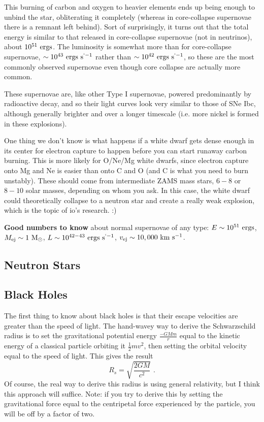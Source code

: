 This burning of carbon and oxygen to heavier elements ends up being enough to unbind the star, obliterating it completely (whereas in core-collapse supernovae there is a remnant left behind). Sort of surprisingly, it turns out that the total energy is similar to that released in core-collapse supernovae (not in neutrinos), about $10^{51}~{\rm ergs}$. The luminosity is somewhat more than for core-collapse supernovae, $\sim10^{43}~{\rm ergs}~{\rm s}^{`-1}$ rather than $\sim10^{42}~{\rm ergs}~{\rm s}^{`-1}$, so these are the most commonly observed supernovae even though core collapse are actually more common.

These supernovae are, like other Type I supernovae, powered predominantly by radioactive decay, and so their light curves look very similar to those of SNe Ibc, although generally brighter and over a longer timescale (i.e. more nickel is formed in these explosions).

One thing we don't know is what happens if a white dwarf gets dense enough in its center for electron capture to happen before you can start runaway carbon burning. This is more likely for O/Ne/Mg white dwarfs, since electron capture onto Mg and Ne is easier than onto C and O (and C is what you need to burn unstably). These should come from intermediate ZAMS mass stars, $6-8$ or $8-10$ solar masses, depending on whom you ask. In this case, the white dwarf could theoretically collapse to a neutron star and create a really weak explosion, which is the topic of io's research. :)

\textbf{Good numbers to know} about normal supernovae of any type: $E \sim 10^{51}~{\rm ergs}$, $M_{\rm ej} \sim 1~{\rm M}_\odot$, $L \sim 10^{42-43}~{\rm ergs}~{\rm s}^{`-1}$, $v_{\rm ej} \sim 10,000~{\rm km}~{\rm s}^{-1}$.

\subsection{Neutron Stars}

\subsection{Black Holes}

The first thing to know about black holes is that their escape velocities are greater than the speed of light. The hand-wavey way to derive the Schwarzschild radius is to set the gravitational potential energy $\frac{-G Mm}{r}$ equal to the kinetic energy of a classical particle orbiting it $\frac{1}{2}m v^2$, then setting the orbital velocity equal to the speed of light. This gives the result
\begin{equation}
R_s = \sqrt{\frac{2GM}{c^2}}\,\,.
\end{equation}
Of course, the real way to derive this radius is using general relativity, but I think this approach will suffice. Note: if you try to derive this by setting the gravitational force equal to the centripetal force experienced by the particle, you will be off by a factor of two.


